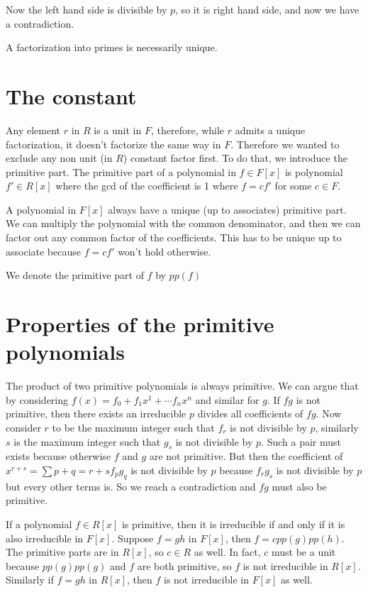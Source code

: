 \documentclass{article}
\begin{document}
Now the left hand side is divisible by $ p $, so it is right hand side, and now we have a contradiction.

A factorization into primes is necessarily unique. 

\section*{The constant}
Any element $ r $ in $ R $ is a unit in $ F $, therefore, while $ r $ admits a unique factorization, it doesn't factorize the same way in $ F $. Therefore we wanted to exclude any non unit (in $ R $) constant factor first. To do that, we introduce the primitive part. The primitive part of a polynomial in $ f \in F[x] $ is polynomial $ f' \in R[x] $ where the gcd of the coefficient is 1 where $ f = c f' $ for some $ c \in F $. 

A polynomial in $ F[x] $ always have a unique (up to associates) primitive part. We can multiply the polynomial with the common denominator, and then we can factor out any common factor of the coefficients. This has to be unique up to associate because $ f = c f' $ won't hold otherwise. 

We denote the primitive part of $ f $ by $ pp(f) $

\section*{Properties of the primitive polynomials}
The product of two primitive polynomials is always primitive. We can argue that by considering $ f(x) = f_0 + f_1 x^1 + \cdots f_n x^n $ and similar for $ g $. If $ fg $ is not primitive, then there exists an irreducible $ p $ divides all coefficients of $ fg $. Now consider $ r $ to be the maximum integer such that $ f_r $ is not divisible by $ p $, similarly $ s $ is the maximum integer such that $ g_s $ is not divisible by $ p $. Such a pair must exists because otherwise $ f $ and $ g $ are not primitive. But then the coefficient of $ x^{r+s} = \sum\limits{p + q = r + s}f_p g_q $ is not divisible by $ p $ because $ f_r g_s $ is not divisible by $ p $ but every other terms is. So we reach a contradiction and $ fg $ must also be primitive.

If a polynomial $ f \in R[x] $ is primitive, then it is irreducible if and only if it is also irreducible in $ F[x] $. Suppose $ f = gh $ in $ F[x] $, then $ f = c pp(g)pp(h) $. The primitive parts are in $ R[x] $, so $ c \in R $ as well. In fact, $ c $ must be a unit because $ pp(g)pp(g) $ and $ f $ are both primitive, so $ f $ is not irreducible in $ R[x] $. Similarly if $ f = gh $ in $ R[x] $, then $ f $ is not irreducible in $ F[x] $ as well.
\end{document}

